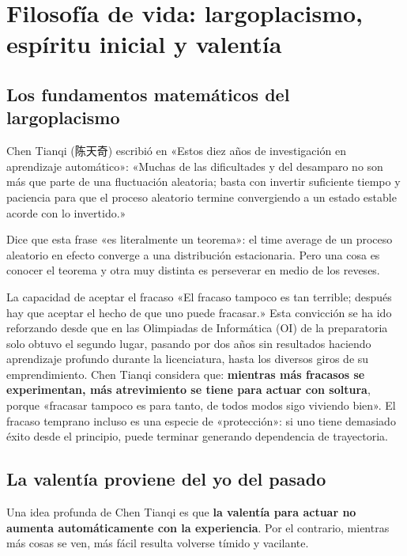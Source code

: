 \section{Filosofía de vida: largoplacismo, espíritu inicial y valentía}

\subsection{Los fundamentos matemáticos del largoplacismo}

Chen Tianqi (陈天奇) escribió en «Estos diez años de investigación en aprendizaje automático»: «Muchas de las dificultades y del desamparo no son más que parte de una fluctuación aleatoria; basta con invertir suficiente tiempo y paciencia para que el proceso aleatorio termine convergiendo a un estado estable acorde con lo invertido.»

Dice que esta frase «es literalmente un teorema»: el time average de un proceso aleatorio en efecto converge a una distribución estacionaria. Pero una cosa es conocer el teorema y otra muy distinta es perseverar en medio de los reveses.

\begin{importantbox}{La capacidad de aceptar el fracaso}
«El fracaso tampoco es tan terrible; después hay que aceptar el hecho de que uno puede fracasar.» Esta convicción se ha ido reforzando desde que en las Olimpiadas de Informática (OI) de la preparatoria solo obtuvo el segundo lugar, pasando por dos años sin resultados haciendo aprendizaje profundo durante la licenciatura, hasta los diversos giros de su emprendimiento. Chen Tianqi considera que: \textbf{mientras más fracasos se experimentan, más atrevimiento se tiene para actuar con soltura}, porque «fracasar tampoco es para tanto, de todos modos sigo viviendo bien». El fracaso temprano incluso es una especie de «protección»: si uno tiene demasiado éxito desde el principio, puede terminar generando dependencia de trayectoria.
\end{importantbox}

\subsection{La valentía proviene del yo del pasado}

Una idea profunda de Chen Tianqi es que \textbf{la valentía para actuar no aumenta automáticamente con la experiencia}. Por el contrario, mientras más cosas se ven, más fácil resulta volverse tímido y vacilante.

